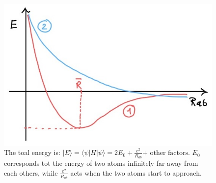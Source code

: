 \begin{figure}[htbp!]
	\centering
	\includegraphics[scale=0.30]{img_9}
	\caption{The toal energy is: $|E \rangle = \langle \psi | H | \psi \rangle = 2E_0 + \frac{e^2}{R_{ab}} \text{+ other factors}$. $E_0$ corresponds tot the energy of two atoms infinitely far away from each others, while $\frac{e^2}{R_{ab}}$ acts when the two atoms start to approach.}
	\label{fig:variational}
\end{figure}

